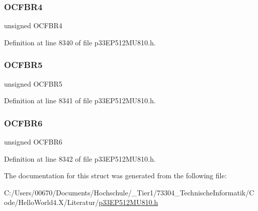 \subsubsection{\texorpdfstring{O\+C\+F\+B\+R4}{OCFBR4}}
{\footnotesize\ttfamily unsigned O\+C\+F\+B\+R4}



Definition at line 8340 of file p33\+E\+P512\+M\+U810.\+h.

\mbox{\label{structtag_r_p_i_n_r11_b_i_t_s_a97d1fcab6d03c22d9cbe0f37c4d06f55}} 
\subsubsection{\texorpdfstring{O\+C\+F\+B\+R5}{OCFBR5}}
{\footnotesize\ttfamily unsigned O\+C\+F\+B\+R5}



Definition at line 8341 of file p33\+E\+P512\+M\+U810.\+h.

\mbox{\label{structtag_r_p_i_n_r11_b_i_t_s_abd4aa2eb078d4e5a6dbe26be47aba471}} 
\subsubsection{\texorpdfstring{O\+C\+F\+B\+R6}{OCFBR6}}
{\footnotesize\ttfamily unsigned O\+C\+F\+B\+R6}



Definition at line 8342 of file p33\+E\+P512\+M\+U810.\+h.



The documentation for this struct was generated from the following file\+:\begin{DoxyCompactItemize}
\item 
C\+:/\+Users/00670/\+Documents/\+Hochschule/\+\_\+\+Tier1/73304\+\_\+\+Technische\+Informatik/\+Code/\+Hello\+World4.\+X/\+Literatur/\hyperlink{p33_e_p512_m_u810_8h}{p33\+E\+P512\+M\+U810.\+h}\end{DoxyCompactItemize}
